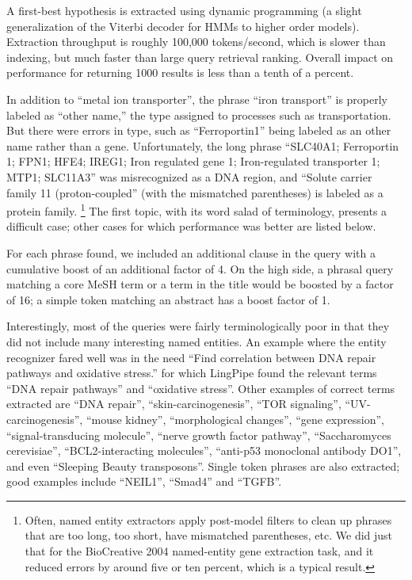 \documentclass[11pt,oneside]{article}
\begin{document}
A first-best hypothesis is extracted using dynamic programming (a
slight generalization of the Viterbi decoder for HMMs to higher order
models).  Extraction throughput is roughly 100,000 tokens/second,
which is slower than indexing, but much faster than large
query retrieval ranking.  Overall impact on performance for
returning 1000 results is less than a tenth of a percent.

In addition to ``metal ion transporter'', the phrase ``iron
transport'' is properly labeled as ``other name,'' the type assigned
to processes such as transportation.  But there were errors in type,
such as ``Ferroportin1'' being labeled as an other name rather than a
gene.  Unfortunately, the long phrase ``SLC40A1; Ferroportin 1; FPN1;
HFE4; IREG1; Iron regulated gene 1; Iron-regulated transporter 1;
MTP1; SLC11A3'' was misrecognized as a DNA region, and ``Solute
carrier family 11 (proton-coupled'' (with the mismatched parentheses)
is labeled as a protein family.%
%
\footnote{Often, named entity extractors apply post-model filters
to clean up phrases that are too long, too short, have mismatched
parentheses, etc.  We did just that for the BioCreative 2004 
named-entity gene extraction task, and it reduced errors by
around five or ten percent, which is a typical result.}
%  
The first topic, with its word salad of terminology, presents a
difficult case; other cases for which performance was better are
listed below.

For each phrase found, we included an additional clause in the query
with a cumulative boost of an additional factor of 4.  On the high
side, a phrasal query matching a core MeSH term or a term in the title
would be boosted by a factor of 16; a simple token matching an abstract
has a boost factor of 1.

Interestingly, most of the queries were fairly terminologically poor
in that they did not include many interesting named entities.  An
example where the entity recognizer fared well was in the need ``Find
correlation between DNA repair pathways and oxidative stress.''  for
which LingPipe found the relevant terms ``DNA repair pathways'' and
``oxidative stress''.  Other examples of correct terms extracted are
``DNA repair'', ``skin-carcinogenesis'', ``TOR signaling'',
``UV-carcinogenesis'', ``mouse kidney'', ``morphological changes'',
``gene expression'', ``signal-transducing molecule'', ``nerve growth
factor pathway'', ``Saccharomyces cerevisiae'', ``BCL2-interacting
molecules'', ``anti-p53 monoclonal antibody DO1'', and even ``Sleeping
Beauty transposons''.  Single token phrases are also extracted; good
examples include ``NEIL1'', ``Smad4'' and ``TGFB''.
\end{document}

